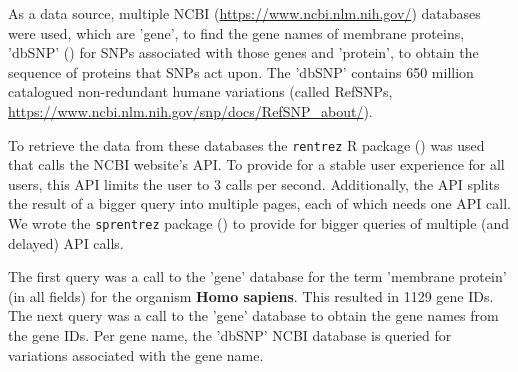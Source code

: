 
As a data source, multiple
NCBI (\url{https://www.ncbi.nlm.nih.gov/}) databases were used,
which are 'gene', to find the gene names of membrane proteins, 
'dbSNP' (\cite{sherry2001dbsnp}) for SNPs associated with those genes
and 'protein', to obtain the sequence of proteins that SNPs act upon.
The 'dbSNP' contains 650 million 
catalogued non-redundant humane variations (called RefSNPs,
\url{https://www.ncbi.nlm.nih.gov/snp/docs/RefSNP_about/}).


To retrieve the data from these databases the
\verb;rentrez; R package (\cite{rentrez}) was used
that calls the NCBI website's API. To provide for a 
stable user experience for all users, 
this API limits the user to 3 calls per second.
Additionally, the API splits the result of a bigger
query into multiple pages, each of which needs one API call.
We wrote the \verb;sprentrez; package (\cite{sprentrez}) to provide for 
bigger queries of multiple (and delayed) API calls.


The first query was a call to the 'gene' database for the 
term 'membrane protein' (in all fields) for the organism \textbf{Homo sapiens}.
This resulted in 1129 gene IDs.
The next query was a call to the 'gene' database 
to obtain the gene names from the gene IDs.
Per gene name, the 'dbSNP' NCBI database is queried for 
variations associated with the gene name. 


